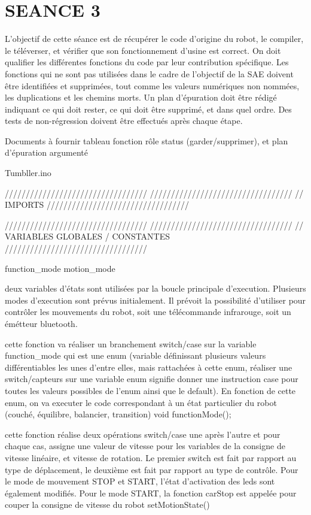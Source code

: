 \section{SEANCE 3}
L'objectif de cette séance est de récupérer le code d'origine du robot, le compiler, le téléverser, et vérifier que son
fonctionnement d'usine est correct.
On doit qualifier les différentes fonctions du code par leur contribution spécifique.
Les fonctions qui ne sont pas utilisées dans le cadre de l'objectif de la SAE doivent être identifiées et supprimées,
tout comme les valeurs numériques non nommées, les duplications et les chemins morts.
Un plan d'épuration doit être rédigé indiquant ce qui doit rester, ce qui doit être supprimé, et dans quel ordre.
Des tests de non-régression doivent être effectués après chaque étape.

Documents à fournir
tableau fonction rôle status (garder/supprimer), et plan d'épuration argumenté


Tumbller.ino

//////////////////////////////////
//////////////////////////////////
// IMPORTS
//////////////////////////////////

//////////////////////////////////
//////////////////////////////////
// VARIABLES GLOBALES / CONSTANTES
//////////////////////////////////

function_mode
motion_mode


deux variables d'états sont utilisées par la boucle 
principale d'execution. Plusieurs modes d'execution
sont prévus initialement.
Il prévoit la possibilité d'utiliser pour contrôler
les mouvements du robot, soit une  télécommande 
infrarouge, soit un émétteur bluetooth.

cette fonction va réaliser un branchement switch/case 
sur la variable function_mode qui est une enum (variable définissant plusieurs valeurs
différentiables les unes d'entre elles, mais rattachées à cette enum, réaliser une 
switch/capteurs sur une variable enum signifie donner une instruction case pour 
toutes les valeurs possibles de l'enum ainsi que le default).
En fonction de cette enum, on va executer le code correspondant à un état particulier du robot
(couché, équilibre, balancier, transition)
void functionMode();

cette fonction réalise deux opérations switch/case une après l'autre
et pour chaque cas, assigne une valeur de vitesse pour les variables 
de la consigne de vitesse linéaire, et vitesse de rotation.
Le premier switch est fait par rapport au type de déplacement, le deuxième est
fait par rapport au type de contrôle.
Pour le mode de mouvement STOP et START, l'état d'activation des leds sont également modifiés.
Pour le mode START, la fonction carStop est appelée pour couper la consigne de vitesse du robot
setMotionState()

